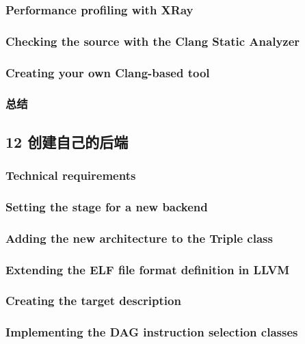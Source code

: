 \documentclass[11pt,a4paper,UTF8]{ctexart}
\begin{document}
		\subsubsection{Performance profiling with XRay}
		\subsubsection{Checking the source with the Clang Static Analyzer}
		\subsubsection{Creating your own Clang-based tool}
		\subsubsection{总结}
	\subsection{12 创建自己的后端}
		\subsubsection{Technical requirements}
		\subsubsection{Setting the stage for a new backend}
		\subsubsection{Adding the new architecture to the Triple class}
		\subsubsection{Extending the ELF file format definition in LLVM}
		\subsubsection{Creating the target description}
		\subsubsection{Implementing the DAG instruction selection classes}
\end{document}
